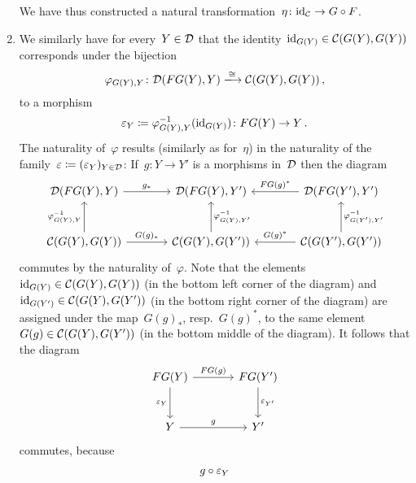 \begin{remark}
\begin{enumerate}
      We have thus constructed a natural transformation~$\eta \colon \mathrm{id}_{\mathcal{C}} \to G \circ F$.
    \item
      We similarly have for every~$Y \in \mathcal{D}$ that the identity~$\mathrm{id}_{G(Y)} \in \mathcal{C}(G(Y), G(Y))$ corresponds under the bijection
      \[
                        \varphi_{G(Y), Y}
        \colon          \Dcat(FG(Y), Y)
        \xlongto{\cong} \Ccat(G(Y), G(Y)) \,,
      \]
      to a morphism
      \[
                  \varepsilon_Y
        \coloneqq  \varphi_{G(Y), Y}^{-1}( \mathrm{id}_{G(Y)} )
        \colon    FG(Y)
        \to       Y \,.
      \]
      The naturality of~$\varphi$ results (similarly as for~$\eta$) in the naturality of the family~$\varepsilon \coloneqq (\varepsilon_Y)_{Y \in \mathcal{D}}$:
      If~$g \colon Y \to Y'$ is a morphisms in~$\mathcal{D}$ then the diagram
      \begin{equation}
        \label{big diagram again}
        \begin{tikzcd}[sep = large]
            \Dcat(FG(Y), Y)
            \arrow{r}[above]{g_*}
          & \Dcat(FG(Y), Y')
          & \Dcat(FG(Y'), Y')
            \arrow{l}[above]{FG(g)^*}
          \\
            \Ccat(G(Y), G(Y))
            \arrow{u}[left]{\varphi_{G(Y), Y}^{-1}}
            \arrow{r}[above]{G(g)_*}
          & \Ccat(G(Y), G(Y'))
            \arrow{u}[right]{\varphi_{G(Y), Y'}^{-1}}
          & \Ccat(G(Y'), G(Y'))
            \arrow{u}[right]{\varphi_{G(Y'), Y'}^{-1}}
            \arrow{l}[above]{G(g)^*}
        \end{tikzcd}
      \end{equation}
      commutes by the naturality of~$\varphi$.
      Note that the elements~$\mathrm{id}_{G(Y)} \in \mathcal{C}(G(Y), G(Y))$ (in the bottom left corner of the diagram) and~$\mathrm{id}_{G(Y')} \in \mathcal{C}(G(Y), G(Y'))$ (in the bottom right corner of the diagram) are assigned under the map~$G(g)_*$, resp.~$G(g)^*$, to the same element~$G(g) \in \mathcal{C}(G(Y), G(Y'))$ (in the bottom middle of the diagram).
      It follows that the diagram
      \[
        \begin{tikzcd}[sep = large]
            FG(Y)
            \arrow{r}[above]{FG(g)}
            \arrow{d}[left]{\varepsilon_Y}
          & FG(Y')
            \arrow{d}[right]{\varepsilon_{Y'}}
          \\
            Y
            \arrow{r}[above]{g}
          & Y'
        \end{tikzcd}
      \]
      commutes, because
      \begin{align}
         {}&  g \circ \varepsilon_Y  \notag  \\

\end{align}
\end{enumerate}
\end{remark}
